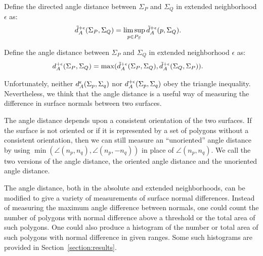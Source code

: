Define the directed angle distance between $\Sigma_P$ and $\Sigma_Q$
in extended neighborhood $\epsilon$ as:
\begin{align*}
\tilde{d}_A^{+\epsilon}(\Sigma_P,\Sigma_Q) & = \limsup_{p \in P_S} \tilde{d}_A^{+\epsilon}(p,\Sigma_Q).
\end{align*}

Define the angle distance between $\Sigma_P$ and $\Sigma_Q$
in extended neighborhood $\epsilon$ as:
\begin{align*}
d_A^{+\epsilon}(\Sigma_P,\Sigma_Q) & = 
\max(\tilde{d}_A^{+\epsilon}(\Sigma_P,\Sigma_Q), \tilde{d}_A^{+\epsilon}(\Sigma_Q,\Sigma_P)).
\end{align*}

Unfortunately, neither $d_A^\epsilon(\Sigma_p, \Sigma_q)$
nor $d_A^{+\epsilon}(\Sigma_p, \Sigma_q)$ obey the triangle inequality.
Nevertheless, we think that the angle distance is a useful way
of measuring the difference in surface normals between two surfaces.

The angle distance depends upon a consistent orientation of the two surfaces.
If the surface is not oriented or if it is represented by a set
of polygons without a consistent orientation,
then we can still measure an ``unoriented'' angle distance
by using $\min(\angle(n_p,n_q),\angle(n_p,-n_q))$
in place of $\angle(n_p,n_q)$.
We call the two versions of the angle distance,
the oriented angle distance and the unoriented angle distance.

The angle distance, both in the absolute and extended neighborhoods,
can be modified to give a variety of measurements of surface normal differences.
Instead of measuring the maximum angle difference between normals,
one could count the number of polygons with normal difference above
a threshold or the total area of such polygons.
One could also produce a histogram of the number or total area
of such polygons with normal difference in given ranges.
Some such histograms are provided in Section~\ref{section:results}.
